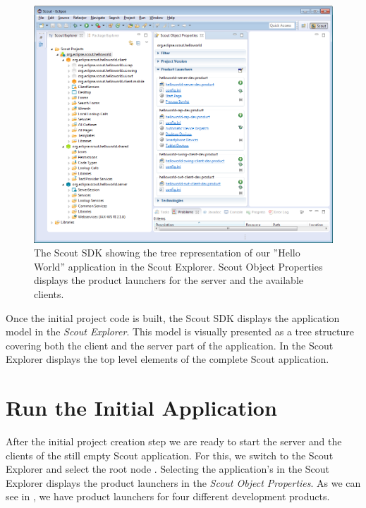 \documentclass[a4paper,10pt,twoside]{book}
\begin{document}
\begin{figure}
\includegraphics[width=15cm]{sdk_initial_helloworld_project.png}
\caption{The Scout SDK showing the tree representation of our ''Hello World'' application in the Scout Explorer.
Scout Object Properties displays the product launchers for the server and the available clients.}
\end{figure}

Once the initial project code is built, the Scout SDK displays the application model in the \textit{Scout Explorer}.
This model is visually presented as a tree structure covering both the client and the server part of the application.
In  the Scout Explorer displays the top level elements of the complete Scout application.

\section{Run the Initial Application}

After the initial project creation step we are ready to start the server and the clients of the still empty Scout application.
For this, we switch to the Scout Explorer and select the root node .
Selecting the application's  in the Scout Explorer displays the product launchers in the \textit{Scout Object Properties}.
As we can see in , we have product launchers for four different development products.
\end{document}

